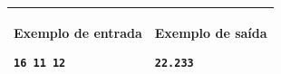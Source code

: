 \begin{table}[!h]
\centering
\begin{tabular}{|l|l|}
\hline
\begin{minipage}[t]{3in}
\textbf{Exemplo de entrada}
\begin{verbatim}
16 11 12
\end{verbatim}
\vspace{1mm}
\end{minipage}
&
\begin{minipage}[t]{3in}
\textbf{Exemplo de saída}
\begin{verbatim}
22.233
\end{verbatim}
\vspace{1mm}
\end{minipage} \\
\hline
\end{tabular}
\end{table}
